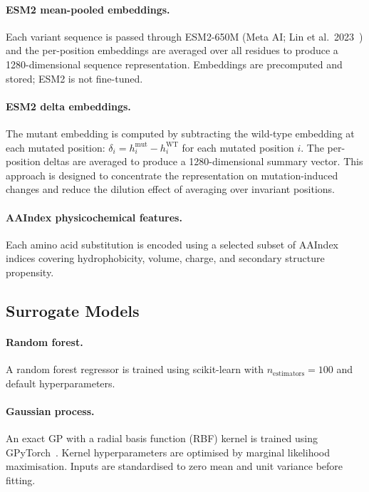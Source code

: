 \documentclass[english, 12pt, a4paper, elec, utf8, a-2b, online]{aaltothesis}
\begin{document}
\paragraph{ESM2 mean-pooled embeddings.}
Each variant sequence is passed through ESM2-650M (Meta AI; Lin et al.\ 2023~\cite{Lin2023ESM2})
and the per-position embeddings are averaged over all residues to produce a 1280-dimensional
sequence representation.
Embeddings are precomputed and stored; ESM2 is not fine-tuned.

\paragraph{ESM2 delta embeddings.}
The mutant embedding is computed by subtracting the wild-type embedding at each mutated
position: $\delta_i = h^\text{mut}_i - h^\text{WT}_i$ for each mutated position $i$.
The per-position deltas are averaged to produce a 1280-dimensional summary vector.
This approach is designed to concentrate the representation on mutation-induced changes
and reduce the dilution effect of averaging over invariant positions.

\paragraph{AAIndex physicochemical features.}
Each amino acid substitution is encoded using a selected subset of AAIndex~\cite{Kawashima2000}
indices covering hydrophobicity, volume, charge, and secondary structure propensity.

\subsection{Surrogate Models}
\label{sec:methods:surrogates}

\paragraph{Random forest.}
A random forest regressor is trained using scikit-learn with $n_\text{estimators} = 100$
and default hyperparameters.

\paragraph{Gaussian process.}
An exact GP with a radial basis function (RBF) kernel is trained using GPyTorch~\cite{Gardner2018}.
Kernel hyperparameters are optimised by marginal likelihood maximisation.
Inputs are standardised to zero mean and unit variance before fitting.
\end{document}
